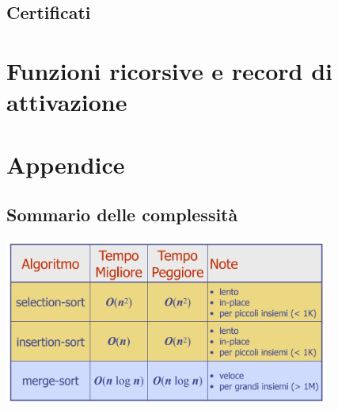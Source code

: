 \documentclass{article}
\begin{document}
\subsection{Certificati}

\pagebreak

\section{Funzioni ricorsive e record di attivazione}


\section{Appendice}
\subsection*{Sommario delle complessità}
\begin{center}
  \includegraphics[width=0.8\textwidth]{costo_algo}
\end{center}
\end{document}
